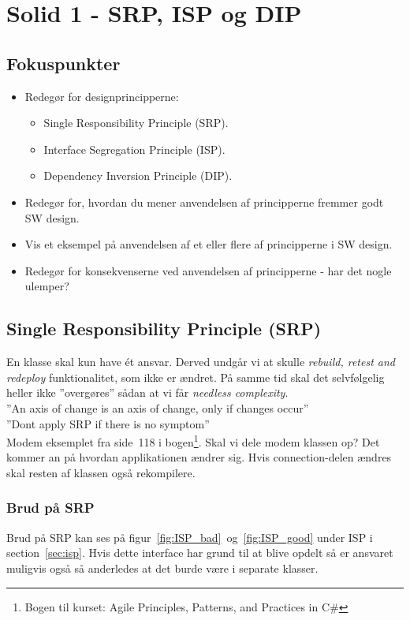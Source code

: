\section{Solid 1 - SRP, ISP og DIP}

\subsection{Fokuspunkter}

\begin{itemize}
	\item Redegør for designprincipperne:
	\begin{itemize}
		\item Single Responsibility Principle (SRP).
		\item Interface Segregation Principle (ISP).
		\item Dependency Inversion Principle (DIP).
	\end{itemize}
	\item Redegør for, hvordan du mener anvendelsen af principperne fremmer godt SW design.
	\item Vis et eksempel på anvendelsen af et eller flere af principperne i SW design.
	\item Redegør for konsekvenserne ved anvendelsen af principperne - har det nogle ulemper?
\end{itemize}


\subsection{Single Responsibility Principle (SRP)}
En klasse skal kun have ét ansvar. Derved undgår vi at skulle \textit{rebuild, retest and redeploy} funktionalitet, som ikke er ændret. På samme tid skal det selvfølgelig heller ikke ''overgøres'' sådan at vi får \textit{needless complexity}.\\

''An axis of change is an axis of change, only if changes occur''\\

''Dont apply SRP if there is no symptom''\\

Modem eksemplet fra side~118 i bogen\footnote{Bogen til kurset: Agile Principles, Patterns, and Practices in C\#}. Skal vi dele modem klassen op? Det kommer an på hvordan applikationen ændrer sig. Hvis connection-delen ændres skal resten af klassen også rekompilere.

\subsubsection{Brud på SRP} \label{sec:brud_isp}
Brud på SRP kan ses på figur~\ref{fig:ISP_bad}~og~\ref{fig:ISP_good} under ISP i section~\ref{sec:isp}. Hvis dette interface har grund til at blive opdelt så er ansvaret muligvis også så anderledes at det burde være i separate klasser.


